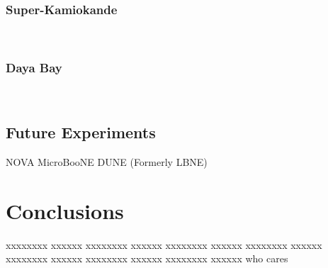 \documentclass[aps,prd,twocolumn,nofootinbib]{revtex4-1}
\begin{document}
\subsubsection{Super-Kamiokande}

~\cite{SuperK}


\subsubsection{Daya Bay}

~\cite{DayaBay}

\subsection{Future Experiments}
NOVA
MicroBooNE
DUNE (Formerly LBNE)


\section{Conclusions}
xxxxxxxx xxxxxx xxxxxxxx xxxxxx xxxxxxxx xxxxxx xxxxxxxx xxxxxx xxxxxxxx xxxxxx xxxxxxxx xxxxxx xxxxxxxx xxxxxx
who cares
\end{document}

